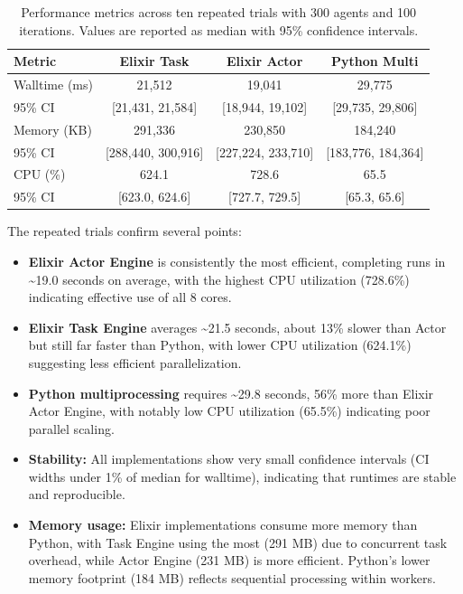 \documentclass[
]{ceurart}
\begin{document}
\begin{table}[ht]
\centering
\caption{Performance metrics across ten repeated trials with 300 agents and 100 iterations.
Values are reported as median with 95\% confidence intervals.}\label{tab:runtime_trials}
\begin{tabular}{lccc}
\toprule
Metric & Elixir Task & Elixir Actor & Python Multi \\
\midrule
Walltime (ms) & 21,512 & 19,041 & 29,775 \\
95\% CI & [21,431, 21,584] & [18,944, 19,102] & [29,735, 29,806] \\
Memory (KB) & 291,336 & 230,850 & 184,240 \\
95\% CI & [288,440, 300,916] & [227,224, 233,710] & [183,776, 184,364] \\
CPU (\%) & 624.1 & 728.6 & 65.5 \\
95\% CI & [623.0, 624.6] & [727.7, 729.5] & [65.3, 65.6] \\
\bottomrule
\end{tabular}
\end{table}

The repeated trials confirm several points:
\begin{itemize}
	\item \textbf{Elixir Actor Engine} is consistently the most efficient, completing runs in \textasciitilde{}19.0 seconds on average, with the highest CPU utilization (728.6\%) indicating effective use of all 8 cores.
	\item \textbf{Elixir Task Engine} averages \textasciitilde{}21.5 seconds, about 13\% slower than Actor but still far faster than Python, with lower CPU utilization (624.1\%) suggesting less efficient parallelization.
	\item \textbf{Python multiprocessing} requires \textasciitilde{}29.8 seconds, 56\% more than Elixir Actor Engine, with notably low CPU utilization (65.5\%) indicating poor parallel scaling.
	\item \textbf{Stability:} All implementations show very small confidence intervals (CI widths under 1\% of median for walltime), indicating that runtimes are stable and reproducible.
	\item \textbf{Memory usage:} Elixir implementations consume more memory than Python, with Task Engine using the most (291 MB) due to concurrent task overhead, while Actor Engine (231 MB) is more efficient. Python's lower memory footprint (184 MB) reflects sequential processing within workers.
\end{itemize}
\end{document}
